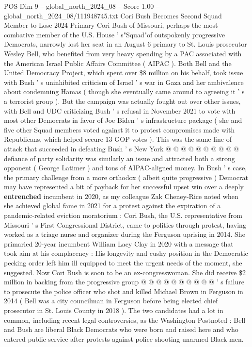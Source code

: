 \begin{textsample}{POS Dim 9 – global\_north\_2024\_08 – Score 1.00 – global\_north\_2024\_08/111948745.txt}  \label{ex:f9_pos_360}
Cori Bush Becomes Second Squad Member to Lose 2024 Primary Cori Bush of Missouri, perhaps the most combative member of the U.S.
House ' s"Squad"of outspokenly progressive Democrats, narrowly lost her seat in an August 6 primary to St.
Louis prosecutor Wesley Bell, who benefited from very heavy spending by a PAC associated with the American Israel Public Affairs Committee ( AIPAC ).
Both Bell and the United Democracy Project, which spent over \$8 million on his behalf, took issue with Bush ' s uninhibited criticism of Israel ' s war in Gaza and her ambivalence about condemning Hamas ( though she eventually came around to agreeing it ' s a terrorist group ).
But the campaign was actually fought out over other issues, with Bell and UDC criticizing Bush ' s refusal in November 2021 to vote with most other Democrats in favor of Joe Biden ' s infrastructure package ( she and five other Squad members voted against it to protest compromises made with Republicans, which helped secure 13 GOP votes ).
This was the same line of attack that succeeded in defeating Bush ' s New York @ @ @ @ @ @ @ @ @ @ defiance of party solidarity was similarly an issue and attracted both a strong opponent ( George Latimer ) and tons of AIPAC-aligned money.
In Bush ' s case, the primary challenge from a more orthodox ( albeit quite progressive ) Democrat may have represented a bit of payback for her successful upset win over a deeply \textbf{entrenched} incumbent in 2020, as my colleague Zak Cheney-Rice noted when she achieved global fame in 2021 for a protest against the expiration of a pandemic-related eviction moratorium : Cori Bush, the U.S. representative from Missouri ' s First Congressional District, came to politics through protest, having worked as a triage nurse and organizer during the Ferguson uprising in 2014.
She primaried 20-year incumbent William Lacy Clay in 2020 with a message that took aim at his complacency : His longevity and cushy position in the Democratic pecking order left him ill equipped to meet the urgent needs of the moment, she suggested.
Now Cori Bush is soon to be an ex-congresswoman.
She did receive \$2 million in backing from the progressive group @ @ @ @ @ @ @ @ @ @ ' s failure to prosecute the police officer who shot and killed Michael Brown in Ferguson in 2014 ( Bell was a city councilman in Ferguson before being elected chief prosecutor in St.
Louis County in 2018 ).
The two candidates had a lot in common, including recent legal controversies, as the Washington Postnoted : Bell and Bush are liberal Black Democrats who were born and raised here and who entered public service after protests against police shooting unarmed Black men.

\end{textsample}
